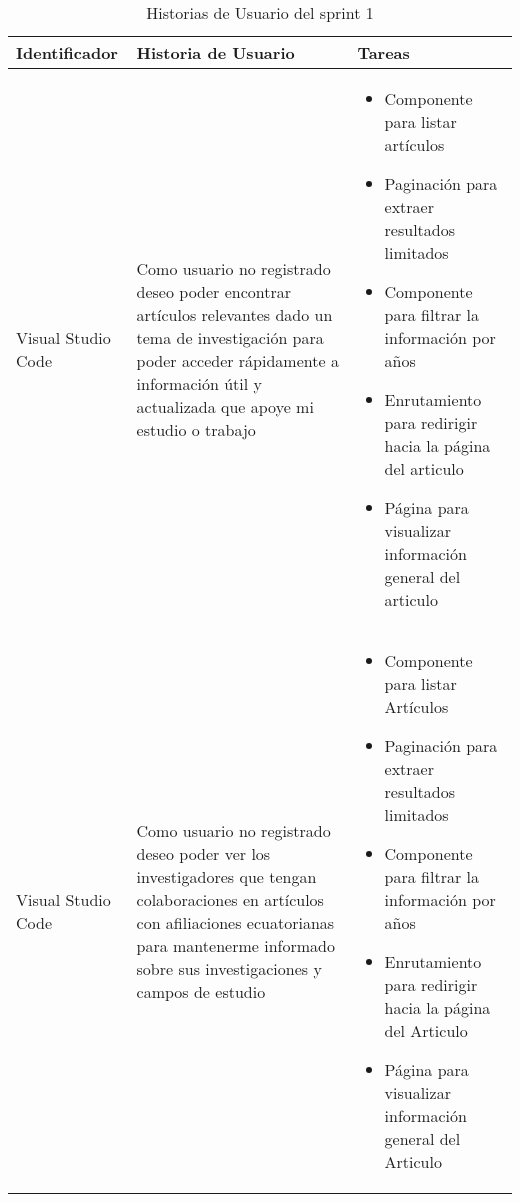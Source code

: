\begin{table}[H]
    \centering
    \begin{tabular}{|m{2.5cm}|m{5cm}|m{6cm}|}
        \hline
        \textbf{Identificador} &  \textbf{Historia de Usuario} & \textbf{Tareas} \\
        
        \hline
        Visual Studio Code & Como usuario no registrado deseo poder encontrar artículos relevantes dado un  tema de investigación para poder acceder rápidamente a información útil y actualizada que apoye mi estudio o trabajo  &  
        \begin{itemize}
            \item Componente para listar \break artículos
            \item Paginación para extraer resultados limitados
            \item Componente para filtrar la información por años
            \item Enrutamiento para redirigir hacia la página del articulo
            \item Página para visualizar información general del articulo
            
        \end{itemize} 
        \\
        \hline
          Visual Studio Code & Como usuario no registrado deseo poder ver los investigadores que tengan colaboraciones en artículos con afiliaciones ecuatorianas para mantenerme informado sobre sus investigaciones y campos de estudio &  
        \begin{itemize}
            \item Componente para listar Artículos
            \item Paginación para extraer resultados limitados
            \item Componente para filtrar la información por años
            \item Enrutamiento para redirigir hacia  la página del Articulo
            \item Página para visualizar información general del Articulo
            
        \end{itemize} 
        \\
        \hline
        
    \end{tabular}
    \caption{Historias de Usuario del sprint 1}
    \label{C2T1:Historias de Usuario del Sprint 1}
\end{table}
